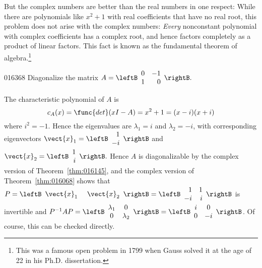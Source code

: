 But the complex numbers are better than the real numbers in one respect: While there are polynomials like $x^{2} + 1$ with real coefficients that have no real root, this problem does not arise with the complex numbers: \textit{Every} nonconstant polynomial with complex coefficients has a complex root, and hence factors completely as a product of linear factors. This fact is known as the fundamental theorem of algebra.\footnote{This was a famous open problem in 1799 when Gauss solved it at the age of 22 in his Ph.D. dissertation.}

\begin{example}{}{016368}
Diagonalize the matrix $A = 
\leftB \begin{array}{rr}
0 & -1 \\
1 & 0
\end{array} \rightB.$

\begin{solution}
The characteristic polynomial of $A$ is
\begin{equation*}
c_A(x) = \func{det} (xI - A) = x^2 + 1 = (x - i)(x + i)
\end{equation*}
where $i^{2} = -1$. Hence the eigenvalues are $\lambda_{1} = i$ and $\lambda_{2} = -i$, with corresponding eigenvectors $\vect{x}_1 = 
\leftB \begin{array}{r}
1 \\
-i
\end{array} \rightB$ and $\vect{x}_2 = 
\leftB \begin{array}{r}
1 \\
i
\end{array} \rightB.$
Hence $A$ is diagonalizable by the complex version of Theorem~\ref{thm:016145}, and the complex version of Theorem~\ref{thm:016068} shows that $P = 
\leftB \begin{array}{cc}
	\vect{x}_1\ & \vect{x}_2
\end{array} \rightB= 
\leftB \begin{array}{rr}
1 & 1 \\
-i & i
\end{array} \rightB$ is invertible and $P^{-1}AP = 
\leftB \begin{array}{cc}
\lambda_1 & 0 \\
0 & \lambda_2
\end{array} \rightB = \leftB \begin{array}{cc}
i & 0 \\
0 & -i
\end{array} \rightB$. Of course, this can be checked directly.
\end{solution}
\end{example}

